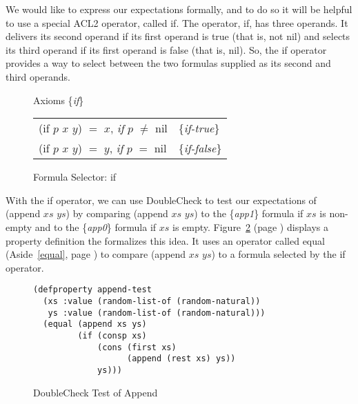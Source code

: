We would like to express our expectations formally,
and to do so it will be helpful to use a special ACL2 operator,
called \textsf{if}.
The operator, \textsf{if}, has three operands.
It delivers its second operand if
its first operand is true (that is, not \textsf{nil})
and selects its third operand
if its first operand is false (that is, \textsf{nil}).
So, the \textsf{if} operator provides a way to select between
the two formulas supplied as its second and third operands.

\begin{figure}
\begin{center}
Axioms \{\emph{if}\} \\
\begin{tabular}{ll}
\textsf{(if $p$ $x$ $y$}) $=$ $x$, \emph{if} $p$ $\neq$ \textsf{nil}  & \{\emph{if-true}\}  \\
\textsf{(if $p$ $x$ $y$)} $=$ $y$, \emph{if} $p$ $=$ \textsf{nil}     & \{\emph{if-false}\} \\
\end{tabular}
\end{center}
\caption{Formula Selector: \textsf{if}}
\label{fig:if-axioms}
\end{figure}

With the \textsf{if} operator, we can use DoubleCheck
to test our expectations of \textsf{(append $xs$ $ys$)}
by comparing \textsf{(append $xs$ $ys$)} to the \{\emph{app1}\} formula
if $xs$ is non-empty and to the \{\emph{app0}\} formula if $xs$ is empty.
Figure~\ref{fig:append-test} (page \pageref{fig:append-test})
displays a property definition the formalizes this idea.
It uses an operator called
\textsf{equal} (Aside~\ref{equal}, page \pageref{equal})
to compare \textsf{(append $xs$ $ys$)}
to a formula selected by the \textsf{if} operator.

\begin{figure}
\begin{Verbatim}
(defproperty append-test
  (xs :value (random-list-of (random-natural))
   ys :value (random-list-of (random-natural)))
  (equal (append xs ys)
         (if (consp xs)
             (cons (first xs)
                   (append (rest xs) ys))
             ys)))
\end{Verbatim}
\caption{DoubleCheck Test of Append}
\label{fig:append-test}
\end{figure}

